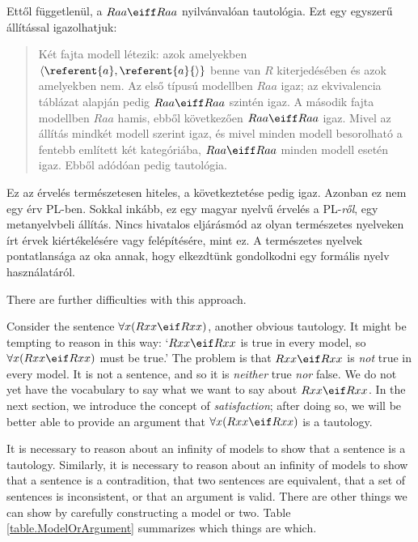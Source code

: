 Ettől függetlenül, a $Raa\eiff Raa$ nyilvánvalóan tautológia. Ezt egy egyszerű állítással igazolhatjuk:
\begin{quote}
\label{allmodels1}
Két fajta modell létezik: azok amelyekben ${\langle}\referent{a},\referent{a}{\rangle}$ benne van $R$ kiterjedésében és azok amelyekben nem. Az első típusú modellben $Raa$ igaz; az ekvivalencia táblázat alapján pedig $Raa\eiff Raa$ szintén igaz. A második fajta modellben $Raa$ hamis, ebből következően $Raa\eiff Raa$ igaz. Mivel az állítás mindkét modell szerint igaz, és mivel minden modell besorolható a fentebb említett két kategóriába, $Raa\eiff Raa$ minden modell esetén igaz. Ebből adódóan pedig tautológia.
\end{quote}
Ez az érvelés természetesen hiteles, a következtetése pedig igaz. Azonban ez nem egy érv PL-ben. Sokkal inkább, ez egy magyar nyelvű érvelés a PL-\emph{ről}, egy metanyelvbeli állítás. Nincs hivatalos eljárásmód az olyan természetes nyelveken írt érvek kiértékelésére vagy felépítésére, mint ez. A természetes nyelvek pontatlansága az oka annak, hogy elkezdtünk gondolkodni egy formális nyelv használatáról.


There are further difficulties with this approach.

Consider the sentence $\forall x(Rxx\eif Rxx)$, another obvious tautology. It might be tempting to reason in this way: `$Rxx\eif Rxx$ is true in every model, so $\forall x(Rxx\eif Rxx)$ must be true.' The problem is that $Rxx\eif Rxx$ is \emph{not} true in every model. It is not a sentence, and so it is \emph{neither} true \emph{nor} false. We do not yet have the vocabulary to say what we want to say about $Rxx\eif Rxx$. In the next section, we introduce the concept of \emph{satisfaction}; after doing so, we will be better able to provide an argument that $\forall x(Rxx\eif Rxx)$ is a tautology.

It is necessary to reason about an infinity of models to show that a sentence is a tautology. Similarly, it is necessary to reason about an infinity of models to show that a sentence is a contradition, that two sentences are equivalent, that a set of sentences is inconsistent, or that an argument is valid. There are other things we can show by carefully constructing a model or two. Table \ref{table.ModelOrArgument} summarizes which things are which.





